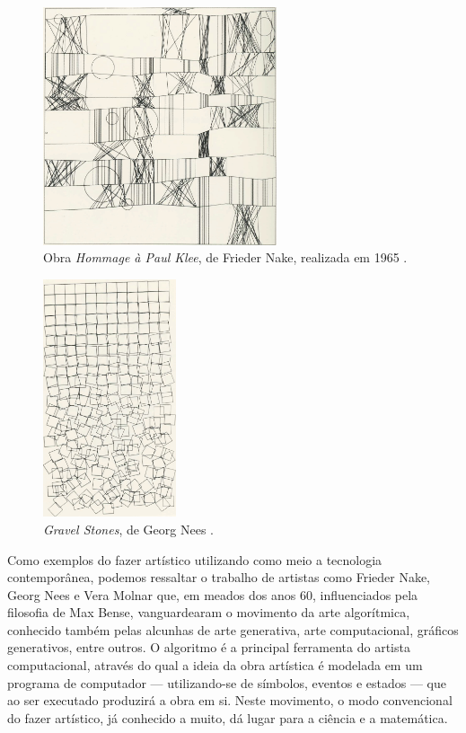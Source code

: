 \documentclass[12pt, a4paper]{article}
\begin{document}
\begin{figure}[ht!]
	\centering
	\includegraphics[width=\textwidth, height=7cm, keepaspectratio=true]{fig/hommage_to_paul_klee}
	\caption{
		Obra \emph{Hommage à Paul Klee}, de Frieder Nake, realizada em 1965 \cite{homage_to_paul_klee}.
	}
\end{figure}

\begin{figure}[ht!]
	\centering
	\includegraphics[width=\textwidth, height=7cm, keepaspectratio=true]{fig/gravel_stones}
	\caption{
		\emph{Gravel Stones}, de Georg Nees
		\cite{gravel_stones}.
	}
\end{figure}

Como exemplos do fazer artístico utilizando como meio a tecnologia contemporânea, podemos ressaltar o trabalho
de artistas como Frieder Nake, Georg Nees e Vera Molnar que, em meados dos anos 60, influenciados pela filosofia de Max Bense, vanguardearam 
o movimento da arte algorítmica, conhecido também pelas alcunhas de arte generativa, arte computacional, gráficos generativos, entre outros.
O algoritmo é a principal ferramenta do artista computacional, através do qual a ideia da obra artística é modelada em um programa de computador --- utilizando-se de símbolos, eventos e estados --- que ao ser executado produzirá a obra em si. Neste movimento, o modo convencional do fazer artístico, já conhecido a muito, dá lugar para a ciência e a matemática. 
\end{document}
